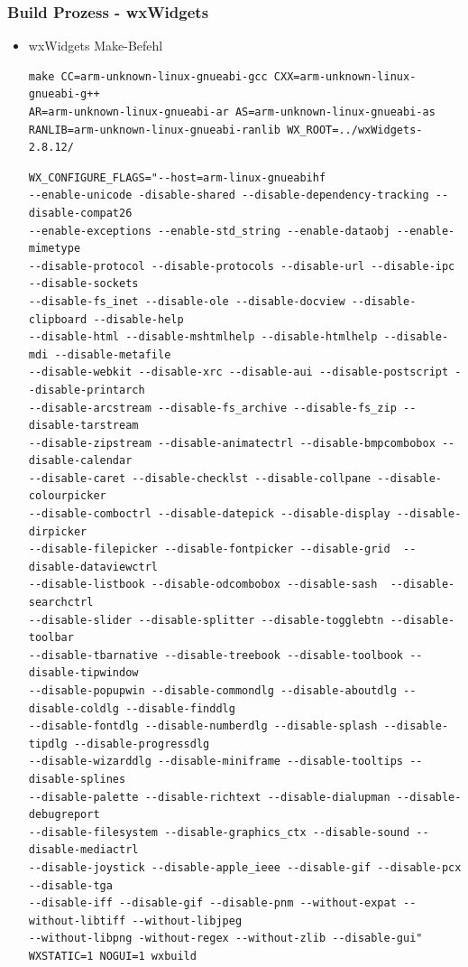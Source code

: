 \documentclass{beamer}
\begin{document}
\begin{frame}[fragile]
\frametitle{Build Prozess - wxWidgets}
\begin{itemize}
\item wxWidgets Make-Befehl
\begin{tiny}
\color{gray}
\begin{verbatim}
make CC=arm-unknown-linux-gnueabi-gcc CXX=arm-unknown-linux-gnueabi-g++
AR=arm-unknown-linux-gnueabi-ar AS=arm-unknown-linux-gnueabi-as
RANLIB=arm-unknown-linux-gnueabi-ranlib WX_ROOT=../wxWidgets-2.8.12/
\end{verbatim}
\color{black}
\begin{verbatim}
WX_CONFIGURE_FLAGS="--host=arm-linux-gnueabihf
--enable-unicode -disable-shared --disable-dependency-tracking --disable-compat26
--enable-exceptions --enable-std_string --enable-dataobj --enable-mimetype
--disable-protocol --disable-protocols --disable-url --disable-ipc --disable-sockets
--disable-fs_inet --disable-ole --disable-docview --disable-clipboard --disable-help
--disable-html --disable-mshtmlhelp --disable-htmlhelp --disable-mdi --disable-metafile
--disable-webkit --disable-xrc --disable-aui --disable-postscript --disable-printarch
--disable-arcstream --disable-fs_archive --disable-fs_zip --disable-tarstream
--disable-zipstream --disable-animatectrl --disable-bmpcombobox --disable-calendar
--disable-caret --disable-checklst --disable-collpane --disable-colourpicker
--disable-comboctrl --disable-datepick --disable-display --disable-dirpicker
--disable-filepicker --disable-fontpicker --disable-grid  --disable-dataviewctrl
--disable-listbook --disable-odcombobox --disable-sash  --disable-searchctrl
--disable-slider --disable-splitter --disable-togglebtn --disable-toolbar
--disable-tbarnative --disable-treebook --disable-toolbook --disable-tipwindow
--disable-popupwin --disable-commondlg --disable-aboutdlg --disable-coldlg --disable-finddlg
--disable-fontdlg --disable-numberdlg --disable-splash --disable-tipdlg --disable-progressdlg
--disable-wizarddlg --disable-miniframe --disable-tooltips --disable-splines
--disable-palette --disable-richtext --disable-dialupman --disable-debugreport
--disable-filesystem --disable-graphics_ctx --disable-sound --disable-mediactrl
--disable-joystick --disable-apple_ieee --disable-gif --disable-pcx --disable-tga
--disable-iff --disable-gif --disable-pnm --without-expat --without-libtiff --without-libjpeg
--without-libpng -without-regex --without-zlib --disable-gui"
WXSTATIC=1 NOGUI=1 wxbuild
\end{verbatim}
\end{tiny}
\end{itemize}
\end{frame}
\end{document}
